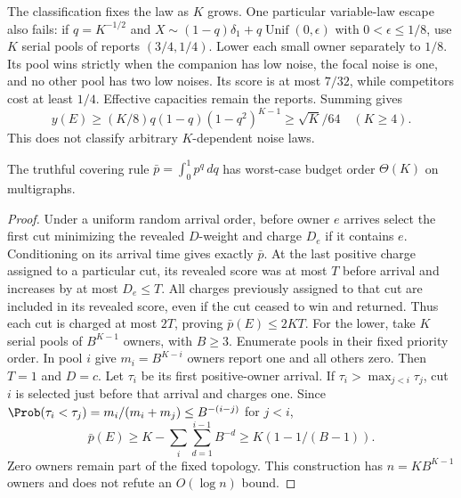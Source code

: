 The classification fixes the law as $K$ grows. One particular variable-law
escape also fails: if $q=K^{-1/2}$ and
$X\sim(1-q)\delta_1+q\operatorname{Unif}(0,\epsilon)$ with
$0<\epsilon\le1/8$, use $K$ serial pools of reports $(3/4,1/4)$.
Lower each small owner separately to $1/8$. Its pool wins strictly when
the companion has low noise, the focal noise is one, and no other pool has
two low noises. Its score is at most $7/32$, while competitors cost at least
$1/4$. Effective capacities remain the reports. Summing gives
\[
 y(E)\ge(K/8)q(1-q)(1-q^2)^{K-1}\ge\sqrt K/64\quad(K\ge4).
\]
This does not classify arbitrary $K$-dependent noise laws.

\begin{proposition}\label{noise:uniform-mixture}
The truthful covering rule $\bar p=\int_0^1p^q\,dq$ has worst-case
budget order $\Theta(K)$ on multigraphs.
\end{proposition}
\begin{proof}
Under a uniform random arrival order, before owner $e$ arrives select the
first cut minimizing the revealed $D$-weight and charge $D_e$ if it contains
$e$. Conditioning on its arrival time gives exactly $\bar p$.
At the last positive charge assigned to a particular cut, its revealed score
was at most $T$ before arrival and increases by at most $D_e\le T$.
All charges previously assigned to that cut are included in its revealed
score, even if the cut ceased to win and returned. Thus each cut is charged
at most $2T$, proving $\bar p(E)\le2KT$.
For the lower, take $K$ serial pools of $B^{K-1}$ owners, with $B\ge3$.
Enumerate pools in their fixed priority order. In pool $i$ give
$m_i=B^{K-i}$ owners report one and all others zero. Then $T=1$ and $D=c$.
Let $\tau_i$ be its first positive-owner arrival. If
$\tau_i>\max_{j<i}\tau_j$, cut $i$ is selected just before that arrival
and charges one. Since
$\Prob(\tau_i<\tau_j)=m_i/(m_i+m_j)\le B^{-(i-j)}$ for $j<i$,
\[
 \bar p(E)\ge K-\sum_i\sum_{d=1}^{i-1}B^{-d}
             \ge K(1-1/(B-1)).
\]
Zero owners remain part of the fixed topology. This construction has
$n=KB^{K-1}$ owners and does not refute an $O(\log n)$ bound.
\end{proof}

